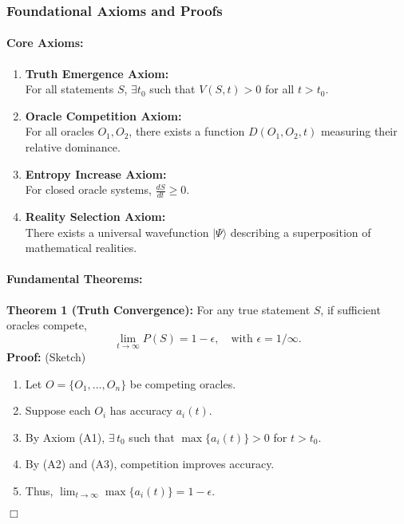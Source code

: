 \documentclass[11pt]{article}
\begin{document}
\subsubsection{Foundational Axioms and Proofs}

\paragraph{Core Axioms:}
\begin{enumerate}[label=(A\arabic*)]
    \item \textbf{Truth Emergence Axiom:} \\
    For all statements $S$, $\exists t_0$ such that $V(S,t)>0$ for all $t>t_0$.
    \item \textbf{Oracle Competition Axiom:} \\
    For all oracles $O_1, O_2$, there exists a function $D(O_1,O_2,t)$ measuring their relative dominance.
    \item \textbf{Entropy Increase Axiom:} \\
    For closed oracle systems, $\displaystyle \frac{dS}{dt}\ge 0$.
    \item \textbf{Reality Selection Axiom:} \\
    There exists a universal wavefunction $|\Psi\rangle$ describing a superposition of mathematical realities.
\end{enumerate}

\paragraph{Fundamental Theorems:}

\textbf{Theorem 1 (Truth Convergence):} For any true statement $S$, if sufficient oracles compete,
\[
\lim_{t\to\infty} P(S)=1-\epsilon, \quad \text{with } \epsilon=1/\infty.
\]
\noindent\textbf{Proof:} (Sketch)
\begin{enumerate}[label=(\roman*)]
    \item Let $O=\{O_1,\dots, O_n\}$ be competing oracles.
    \item Suppose each $O_i$ has accuracy $a_i(t)$.
    \item By Axiom (A1), $\exists\,t_0$ such that $\max\{a_i(t)\}>0$ for $t>t_0$.
    \item By (A2) and (A3), competition improves accuracy.
    \item Thus, $\displaystyle \lim_{t\to\infty} \max\{a_i(t)\}=1-\epsilon$.
\end{enumerate}
\hfill $\Box$
\end{document}
